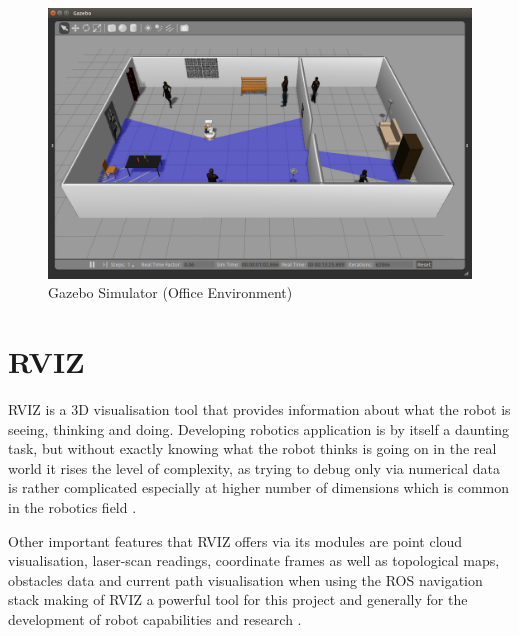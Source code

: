 \begin{figure}[!htbp]
\begin{center}
\includegraphics[width=\linewidth]{images/chapter2_gazebo_screenshot2.png}
\end{center}
\caption{Gazebo Simulator (Office Environment)}
\label{fig:gazebo_screenshot2}
\end{figure}

\section{RVIZ}

RVIZ is a 3D visualisation tool that provides information about what the robot is seeing, thinking and doing. Developing robotics application is by itself a daunting task, but without exactly knowing what the robot thinks is going on in the real world it rises the level of complexity, as trying to debug only via numerical data is rather complicated especially at higher number of dimensions which is common in the robotics field \cite{website:RVIZ}. 

Other important features that RVIZ offers via its modules are point cloud visualisation, laser-scan readings, coordinate frames as well as topological maps, obstacles data and current path visualisation when using the ROS navigation stack making of RVIZ a powerful tool for this project and generally for the development of robot capabilities and research \cite{website:RVIZ}.

